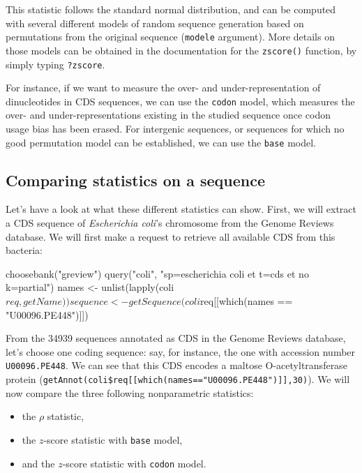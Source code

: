 \documentclass{article}
\begin{document}
This statistic follows the standard normal distribution, and can be
computed with several different models of random sequence generation
based on permutations from the original sequence (\texttt{modele}
argument). More details on those models can be obtained in the
documentation for the \texttt{zscore()} function, by simply typing
\texttt{?zscore}.

For instance, if we want to measure the over- and under-representation
of dinucleotides in CDS sequences, we can use the \texttt{codon}
model, which measures the over- and under-representations existing in
the studied sequence once codon usage bias has been erased. For
intergenic sequences, or sequences for which no good permutation model
can be established, we can use the \texttt{base} model. 

\subsection{Comparing statistics on a sequence}

Let's have a look at what these different statistics can show. First,
we will extract a CDS sequence of \textit{Escherichia coli}'s
chromosome from the Genome Reviews database. We will first make a
request to retrieve all available CDS from this bacteria:

\begin{Schunk}
\begin{Sinput}
 choosebank("greview")
 query("coli", "sp=escherichia coli et t=cds et no k=partial")
 names <- unlist(lapply(coli$req, getName))
 sequence <- getSequence(coli$req[[which(names == "U00096.PE448")]])
\end{Sinput}
\end{Schunk}

From the 34939 sequences
annotated as CDS in the Genome Reviews database, let's choose one
coding sequence: say, for instance, the one with accession number \texttt{U00096.PE448}. We can see
that this CDS encodes a maltose O-acetyltransferase protein
(\verb+getAnnot(coli$req[[which(names=="U00096.PE448")]],30)+). We will now compare the three
following nonparametric statistics:

\begin{itemize}
\item the $\rho$ statistic,
\item the $z$-score statistic with \texttt{base} model,
\item and the $z$-score statistic with \texttt{codon} model.
\end{itemize}
\end{document}
